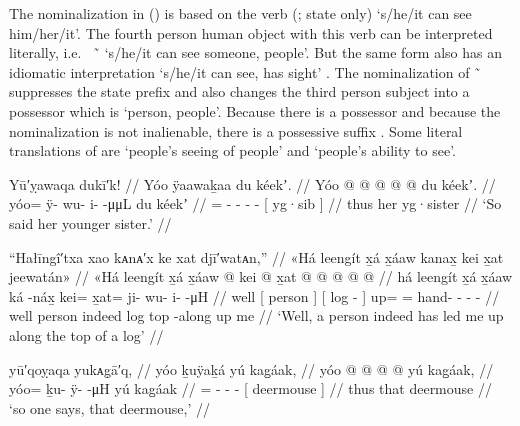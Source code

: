 The nominalization  in (\lastx) is based on the verb  (;  state only) ‘s/he/it can see him/her/it’.
The  fourth person human object with this verb can be interpreted literally, i.e.\  \~\  ‘s/he/it can see someone, people’.
But the same form also has an idiomatic interpretation ‘s/he/it can see, has sight’ \parencite[242–243]{edwards:2009}.
The nominalization of  \~\  suppresses the state prefix  and also changes the third person subject into a possessor which is  ‘person, people’.
Because there is a possessor and because the nominalization is not inalienable, there is a possessive suffix .
Some literal translations of  are ‘people’s seeing of people’ and ‘people’s ability to see’.

\ex\label{ex:92-66-so-said-yg-sis}%
%
\begingl
	\glpreamble	Yū′ỵawaqa dukī′k! //
	\glpreamble	Yóo ÿaawaḵaa du kéekʼ. //
	\gla	Yóo @  @ {} @ {} @ {} @ {}
		{} du kéekʼ. {} //
	\glb	yóo= ÿ- wu- i-  -μμL
		{} du kéekʼ {} //
	\glc	{}= - - -  -
		{}[  yg·sib {}] //
	\gld	thus  {} {} {} {}
		{} her yg·sister {} //
	\glft	‘So said her younger sister.’
		//
\endgl
\xe

\ex\label{ex:92-67-person-led-me-along-log}%
%
\begingl
	\glpreamble	“Hałīngî′txa xao kᴀnᴀ′x ke xat djī′watᴀn,” //
	\glpreamble	«\!Há leengít x̱á x̱áaw kanax̱ kei x̱at jeewatán\!» //
	\gla	«\!Há {} leengít {} x̱á
		{} x̱áaw  @ {} {}
		kei @ x̱at @  @ {} @ {} @ {} @ {} //
	\glb	\pqp{}há {} leengít {} x̱á
		{} x̱áaw ká -náx̱ {}
		kei= x̱at= ji- wu- i-  -μH //
	\glc	\pqp{}well {}[ person {}] 
		{}[ log  - {}]
		up= = hand- - -  - //
	\gld	\pqp{}well {} person {} indeed
		{} log top -along {}
		up me  {} {} {} {} //
	\glft	‘Well, a person indeed has led me up along the top of a log’
		//
\endgl
\xe

\ex\label{ex:92-68-so-says-that-deermouse}%
%
\begingl
	\glpreamble	yū′qoỵaqa yukᴀg̣ā′q, //
	\glpreamble	yóo ḵuÿaḵá yú kag̱áak, //
	\gla	yóo @  @ {} @ {} @ {}
		{} yú kag̱áak, {} //
	\glb	yóo= ḵu- ÿ-  -μH
		{} yú kag̱áak {} //
	\glc	{}= - -  -
		{}[  deermouse {}] //
	\gld	thus  {} {} {}
		{} that deermouse {} //
	\glft	‘so one says, that deermouse,’
		//
\endgl
\xe

